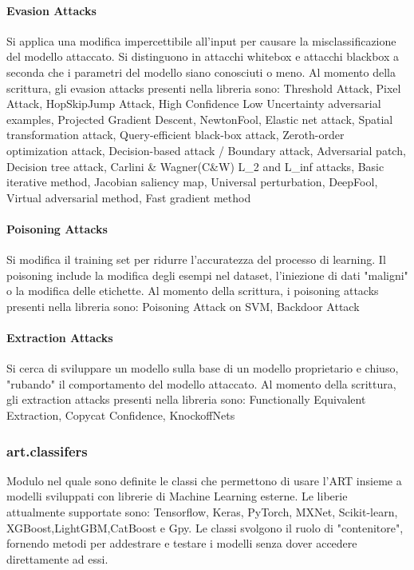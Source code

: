 \paragraph{Evasion Attacks}
Si applica una modifica impercettibile all'input per causare la misclassificazione  del modello attaccato. Si distinguono in attacchi whitebox  e attacchi blackbox a seconda che i parametri del modello
siano conosciuti o meno. Al momento della scrittura, gli evasion attacks presenti nella libreria sono:
 Threshold Attack, Pixel Attack, HopSkipJump Attack, High Confidence Low Uncertainty adversarial examples, Projected Gradient Descent, NewtonFool, Elastic net attack,
Spatial transformation attack, Query-efficient black-box attack, Zeroth-order optimization attack, Decision-based attack / Boundary attack, Adversarial patch, Decision tree attack,
Carlini \& Wagner(C\&W) L\_2 and L\_inf attacks, Basic iterative method, Jacobian saliency map, Universal perturbation, DeepFool, Virtual adversarial method, Fast gradient method

\paragraph{Poisoning Attacks}
Si modifica il training set per ridurre l'accuratezza del processo di learning. Il poisoning include la modifica degli esempi nel dataset, l'iniezione di dati "maligni" o la modifica
delle etichette. Al momento della scrittura, i poisoning attacks presenti nella libreria sono: Poisoning Attack on SVM, Backdoor Attack

\paragraph{Extraction Attacks} Si cerca di sviluppare un modello sulla base di un modello proprietario e chiuso, "rubando" il comportamento del modello attaccato. Al momento della scrittura, gli extraction attacks presenti nella libreria sono: 
Functionally Equivalent Extraction, Copycat Confidence, KnockoffNets

\subsubsection{art.classifers}
Modulo nel quale sono definite le classi che permettono di usare l'ART insieme a modelli sviluppati con librerie di Machine Learning esterne.  Le liberie attualmente supportate sono: 
Tensorflow, Keras, PyTorch, MXNet, Scikit-learn, XGBoost,LightGBM,CatBoost e Gpy. Le classi svolgono il ruolo di "contenitore", fornendo metodi per addestrare e testare i modelli senza dover accedere direttamente
ad essi.
